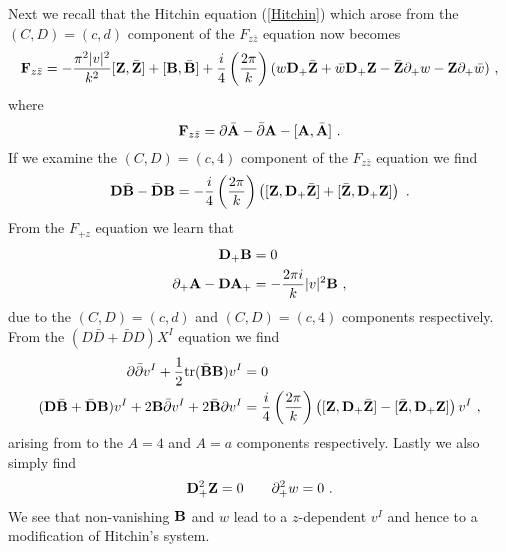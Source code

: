 \documentclass[12pt]{article}
\newcommand{\nn}{\nonumber}
\numberwithin{equation}{section}
\begin{document}
Next we recall that the Hitchin equation (\ref{Hitchin}) which arose from the $(C,D) = (c,d)$ component of the $F_{z\bar z}$ equation now becomes
\begin{align}\label{Hfull}
{\bf F}_{z\bar z} =  -\frac{\pi^2|v|^2}{k^2 }[{\bf Z},\bar {\bf Z}] + [{\bf B},\bar {\bf B}] + \frac{i}{4}\left(\frac{2\pi}{k}\right)(w{\bf D}_+\bar {\bf Z}+\bar w{\bf D}_+ {\bf Z} - \bar{\bf Z}\partial_+w  - {\bf Z}\partial_+\bar w)\ ,
\end{align} 
where
\begin{equation}
{\bf F}_{z\bar z}  =\partial \bar {\bf A} - \bar \partial {\bf A} - [{\bf A},\bar {\bf A}]\ .
\end{equation}
If we examine the $(C,D) = (c,4)$ component of the $F_{z\bar z}$ equation we find
\begin{equation}\label{Fc4}
{\bf D}\bar {\bf B} - \bar{\bf D}{\bf B}  = -\frac{i}{4 }\left(\frac{2\pi}{k}\right)\left([{\bf Z},{\bf D}_+\bar {\bf Z}]+[\bar {\bf Z},{\bf D}_+ {\bf Z}]\right)\ .
\end{equation}
From  the $F_{+z}$ equation we learn that
\begin{align}\label{F+z}
{\bf D}_+{\bf B} &=0\nn\\
\partial_+ {\bf A} - {\bf D}{\bf A}_+ & = -\frac{2\pi i}{k} |v|^2 {\bf B}\ ,
\end{align}
due to the  $(C,D) = (c,d)$ and $(C,D) = (c,4)$ components respectively. 
From the $(D\bar D+\bar D D )X^I$ equation we find
\begin{align}\label{veq}
\partial\bar\partial v^I + \frac{1}{2} {\rm tr }(\bar{\bf B}{\bf B})v^I & = 0\nn\\
({\bf D}\bar {\bf  B}+ \bar {\bf D}{\bf  B})v^I + 2{\bf B}\bar\partial v^I + 2\bar {\bf B}\partial v^I& = \frac{i}{4 }\left(\frac{2\pi}{k}\right)\left([{\bf Z},{\bf D}_+\bar {\bf Z}]-[\bar {\bf Z},{\bf D}_+ {\bf Z}]\right)v^I\ ,
\end{align}
arising from to the  $A=4$ and $A  =  a$ components respectively. 
Lastly we also simply find
\begin{align}
{\bf D}_+^2 {\bf Z}=0\qquad \partial_+^2w=0\ .
\end{align}
We see that non-vanishing ${\bf B}$ and $w$ lead to a $z$-dependent $v^I$ and hence to a modification of Hitchin's system.
\end{document}
